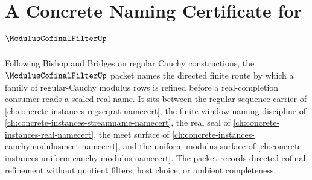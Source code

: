 \chapter{A Concrete Naming Certificate for $\ModulusCofinalFilterUp$}
\label{ch:concrete-instances-modulus-cofinal-filter-namecert}

Following Bishop and Bridges on regular Cauchy constructions, the $\ModulusCofinalFilterUp$ packet names the directed finite route by which a family of regular-Cauchy modulus rows is refined before a real-completion consumer reads a sealed real name. It sits between the regular-sequence carrier of \autoref{ch:concrete-instances-regseqrat-namecert}, the finite-window naming discipline of \autoref{ch:concrete-instances-streamname-namecert}, the real seal of \autoref{ch:concrete-instances-real-namecert}, the meet surface of \autoref{ch:concrete-instances-cauchymodulusmeet-namecert}, and the uniform modulus surface of \autoref{ch:concrete-instances-uniform-cauchy-modulus-namecert}. The packet records directed cofinal refinement without quotient filters, host choice, or ambient completeness.

